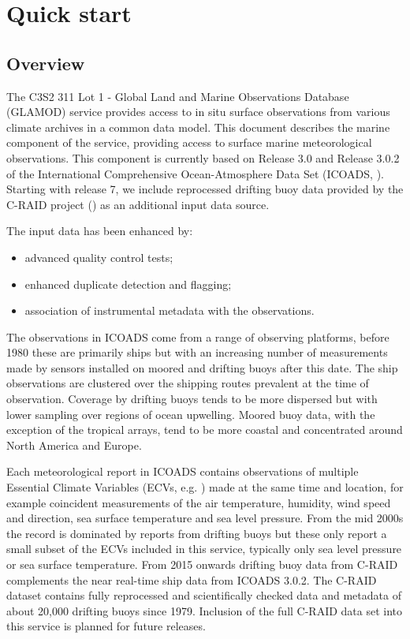 \section{Quick start}
\subsection{Overview}

The C3S2 311 Lot 1 - Global Land and Marine Observations Database (GLAMOD) service provides access to in situ surface observations from various climate archives in a common data model.
This document describes the marine component of the service, providing access to surface marine meteorological observations.
This component is currently based on Release 3.0 and Release 3.0.2 of the International Comprehensive Ocean-Atmosphere Data Set (ICOADS, \cite{Freeman2017,Liu2022}).
Starting with release 7, we include reprocessed drifting buoy data provided by the C-RAID project (\cite{craid202404}) as an additional input data source.

The input data has been enhanced by: 
\begin{itemize}
\item advanced quality control tests; 
\item enhanced duplicate detection and flagging; 
\item association of instrumental metadata with the observations. 
\end{itemize}

The observations in ICOADS come from a range of observing platforms, before 1980 these are primarily ships but with an increasing number of measurements made by sensors installed on moored and drifting buoys after this date. 
The ship observations are clustered over the shipping routes prevalent at the time of observation. 
Coverage by drifting buoys tends to be more dispersed but with lower sampling over regions of ocean upwelling. 
Moored buoy data, with the exception of the tropical arrays, tend to be more coastal and concentrated around North America and Europe.

Each meteorological report in ICOADS contains observations of multiple Essential Climate Variables (ECVs, e.g. \cite{Bojinski2014}) made at the same time and location, for example coincident measurements of the air temperature, humidity, wind speed and direction, sea surface temperature and sea level pressure.
From the mid 2000s the record is dominated by reports from drifting buoys but these only report a small subset of the ECVs included in this service, typically only sea level pressure or sea surface temperature.
From 2015 onwards drifting buoy data from C-RAID complements the near real-time ship data from ICOADS 3.0.2. The C-RAID dataset contains fully reprocessed and scientifically checked data and metadata of about 20,000 drifting buoys since 1979.
Inclusion of the full C-RAID data set into this service is planned for future releases.

